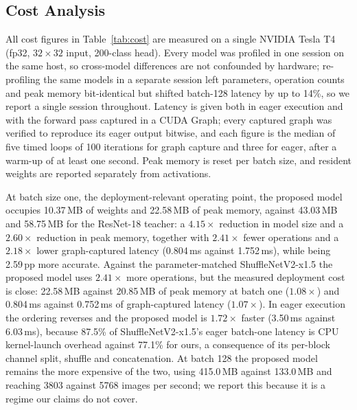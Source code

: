 \subsection{Cost Analysis}
\label{sec:cost}

All cost figures in Table~\ref{tab:cost} are measured on a single NVIDIA
Tesla T4 (fp32, $32\times32$ input, 200-class head). Every model was profiled
in one session on the same host, so cross-model differences are not confounded
by hardware; re-profiling the same models in a separate session left
parameters, operation counts and peak memory bit-identical but shifted
batch-128 latency by up to 14\%, so we report a single session throughout. Latency is given both in eager execution
and with the forward pass captured in a CUDA Graph; every captured graph was
verified to reproduce its eager output bitwise, and each figure is the median
of five timed loops of 100 iterations for graph capture and three for eager,
after a warm-up of at least one second.
Peak memory is reset per batch size, and resident weights are reported
separately from activations.

At batch size one, the deployment-relevant operating point, the proposed model
occupies 10.37\,MB of weights and 22.58\,MB of peak memory, against 43.03\,MB
and 58.75\,MB for the ResNet-18 teacher: a $4.15\times$ reduction in model
size and a $2.60\times$ reduction in peak memory, together with $2.41\times$
fewer operations and a $2.18\times$ lower graph-captured latency (0.804\,ms
against 1.752\,ms), while being 2.59\,pp more accurate. Against the
parameter-matched ShuffleNetV2-x1.5 the proposed model uses $2.41\times$ more
operations, but the measured deployment cost is close: 22.58\,MB against
20.85\,MB of peak memory at batch one ($1.08\times$) and 0.804\,ms against
0.752\,ms of graph-captured latency ($1.07\times$). In eager execution the
ordering reverses and the proposed model is $1.72\times$ faster (3.50\,ms
against 6.03\,ms), because 87.5\% of ShuffleNetV2-x1.5's eager batch-one
latency is CPU kernel-launch overhead against 77.1\% for ours, a consequence
of its per-block channel split, shuffle and concatenation. At batch 128 the
proposed model remains the more expensive of the two, using 415.0\,MB against
133.0\,MB and reaching 3803 against 5768 images per second; we report this
because it is a regime our claims do not cover.

